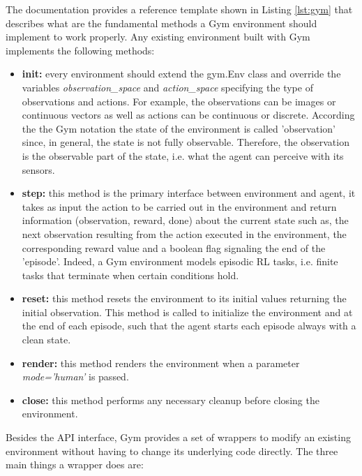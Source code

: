 The documentation provides a reference template shown in Listing \ref{lst:gym} that describes what are the fundamental methods a Gym environment should implement to work properly.
Any existing environment built with Gym implements the following methods:

\begin{center}
  \begin{minipage}{0.45\linewidth}
    
    \end{minipage}
\end{center}

\begin{itemize}
  \item \textbf{init:} every environment should extend the gym.Env class and override the variables \textit{observation\_space} and \textit{action\_space} specifying the type of observations and actions. For example, the observations can be images or continuous vectors as well as actions can be continuous or discrete. According the the Gym notation the state of the environment is called 'observation' since, in general, the state is not fully observable. Therefore, the observation is the observable part of the state, i.e. what the agent can perceive with its sensors.
  \item \textbf{step:} this method is the primary interface between environment and agent, it takes as input the action to be carried out in the environment and return information (observation, reward, done) about the current state such as, the next observation resulting from the action executed in the environment, the corresponding reward value and a boolean flag signaling the end of the 'episode'. Indeed, a Gym environment models episodic RL tasks, i.e. finite tasks that terminate when certain conditions hold.
  \item \textbf{reset:} this method resets the environment to its initial values returning the initial observation. This method is called to initialize the environment and at the end of each episode, such that the agent starts each episode always with a clean state.
  \item \textbf{render:} this method renders the environment when a parameter \textit{mode='human'} is passed.
  \item \textbf{close:} this method performs any necessary cleanup before closing the environment.
\end{itemize}
Besides the API interface, Gym provides a set of wrappers to modify an existing environment without having to change its underlying code directly. The three main things a wrapper does are:

